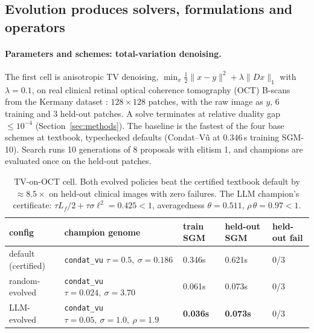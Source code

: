 \subsection{Evolution produces solvers, formulations and operators}

\paragraph{Parameters and schemes: total-variation denoising.}
The first cell is anisotropic TV denoising,
$\min_x \tfrac12\|x - y\|^2 + \lambda\|Dx\|_1$ with $\lambda = 0.1$, on real
clinical retinal optical coherence tomography (OCT) B-scans from the Kermany
dataset \citep{Kermany2018Identifying}: $128\times128$ patches, with the raw
image as $y$, 6 training and 3 held-out patches. A solve terminates at relative
duality gap $\le 10^{-4}$ (Section~\ref{sec:methods}). The baseline is the
fastest of the four base schemes at textbook, typechecked defaults
(Condat--V\~u at $0.346$\,s training SGM-10). Search runs 10 generations of 8
proposals with elitism 1, and champions are evaluated once on the held-out
patches.

\begin{table}[t]
\centering
\small
\begin{tabular}{lllll}
\toprule
config & champion genome & train SGM & held-out SGM & held-out fail \\
\midrule
default (certified) & \texttt{condat\_vu} $\tau{=}0.5,\ \sigma{=}0.186$ & 0.346s & 0.621s & 0/3 \\
random-evolved & \texttt{condat\_vu} $\tau{=}0.024,\ \sigma{=}3.70$ & 0.061s & 0.073s & 0/3 \\
LLM-evolved & \texttt{condat\_vu} $\tau{=}0.05,\ \sigma{=}1.0,\ \rho{=}1.9$ & \textbf{0.036s} & \textbf{0.073s} & 0/3 \\
\bottomrule
\end{tabular}
\caption{TV-on-OCT cell. Both evolved policies beat the certified textbook
default by $\approx 8.5\times$ on held-out clinical images with zero failures.
The LLM champion's certificate: $\tau L_f/2 + \tau\sigma\ell^2 = 0.425 < 1$,
averagedness $\theta = 0.511$, $\rho\,\theta = 0.97 < 1$.}
\label{tab:tv-results}
\end{table}


